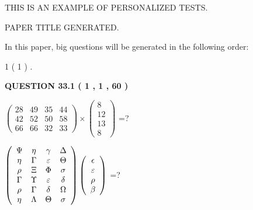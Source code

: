 \documentclass[12pt]{article}
\begin{document}
   
   
   
   
   
   
   
 \vspace{0.2in}
{\Huge  THIS IS AN EXAMPLE OF}
{\Huge  PERSONALIZED TESTS. }
   
   
 PAPER TITLE GENERATED.
   
   
   
\vspace{0.2in}
   
In this paper, big questions will be generated in the following order: 
   
   
             1 (           1 )
 .
  
\vspace{0.2in}
  
{\textbf{\Large{QUESTION
33.1 
 (           1 ,           1 ,          60 )
}}}
  
  
 
$ \left( \begin{array}{ccccccccc}
          28  & 
          49  & 
          35  & 
          44  \\ 
          42  & 
          52  & 
          50  & 
          58  \\ 
          66  & 
          66  & 
          32  & 
          33
\end{array}\right) \times
\left( \begin{array}{c}
           8  \\ 
          12  \\ 
          13  \\ 
           8
\end{array}\right) $ =?
 
 
$  %
 \left( \begin{array}
 {
 c
 c
 c
 c
 }
 \Psi & 
 \eta & 
 \gamma & 
 \Delta \\ 
 \eta & 
 \Gamma & 
 \varepsilon & 
 \Theta \\ 
 \rho & 
                    \Xi & 
 \Phi & 
 \sigma \\ 
 \Gamma & 
 \Upsilon & 
 \varepsilon & 
 \delta \\ 
 \rho & 
 \Gamma & 
 \delta & 
 \Omega \\ 
 \eta & 
 \Lambda & 
 \Theta & 
 \sigma
 \end{array} \right)
 \left( \begin{array}
 {
 c
 }
 \epsilon \\ 
 \varepsilon \\ 
 \rho \\ 
 \beta
 \end{array} \right)
$ =?
 
\end{document}
